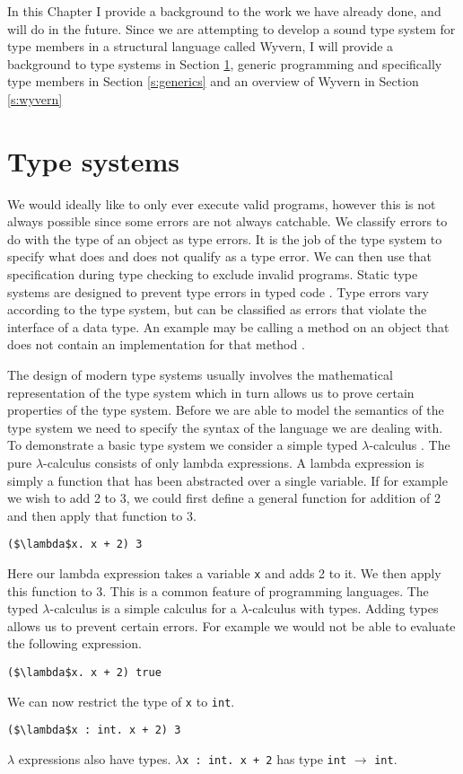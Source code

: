 \documentclass[11pt
              , a4paper
              , twoside
              , openright
              ]{report}
\numberwithin{case}{theorem}
\numberwithin{subcase}{case}
\begin{document}
In this Chapter I provide a background to the work we have already done, and will do in the future. Since we are attempting to develop a sound type system for type members in a structural language called Wyvern, I will provide a background to type systems in Section \ref{s:typesys}, generic programming and specifically type members in Section \ref{s:generics} and an overview of Wyvern in Section \ref{s:wyvern}

\section{Type systems}\label{s:typesys}
We would ideally like to only ever execute valid programs, however this is not always possible since some errors are not always catchable. We classify errors to do with the type of an object as type errors. It is the job of the type system to specify what does and does not qualify as a type error. We can then use that specification during type checking to exclude invalid programs. Static type systems are designed to prevent type errors in typed code \cite{Wright:1994:SAT:191905.191909}. Type errors vary according to the type system, but can be classified as errors that violate the interface of a data type. An example may be calling a method on an object that does not contain an implementation for that method \cite{Wright:1994:SAT:191905.191909}.

The design of modern type systems usually involves the mathematical representation of the type system which in turn allows us to prove certain properties of the type system. Before we are able to model the semantics of the type system we need to specify the syntax of the language we are dealing with. To demonstrate a basic type system we consider a simple typed $\lambda$-calculus \cite{church1940formulation, curry1959combinatory, Pierce:2002:TPL:509043, Barendregt:1993:LCT:162552.162561}. The pure $\lambda$-calculus consists of only lambda expressions. A lambda expression is simply a function that has been abstracted over a single variable. If for example we wish to add 2 to 3, we could first define a general function for addition of 2 and then apply that function to 3.
\begin{lstlisting}[mathescape, style=custom_lang]
($\lambda$x. x + 2) 3
\end{lstlisting}
Here our lambda expression takes a variable \verb|x| and adds 2 to it. We then apply this function to 3. This is a common feature of programming languages. The typed $\lambda$-calculus is a simple calculus for a $\lambda$-calculus with types. Adding types allows us to prevent certain errors. For example we would not be able to evaluate the following expression.
\begin{lstlisting}[mathescape, style=custom_lang]
($\lambda$x. x + 2) true
\end{lstlisting}
We can now restrict the type of \verb|x| to \verb|int|.
\begin{lstlisting}[mathescape, style=custom_lang]
($\lambda$x : int. x + 2) 3
\end{lstlisting}
$\lambda$ expressions also have types. $\lambda$\verb|x : int. x + 2| has type \verb|int| $\rightarrow$ \verb|int|. 
\end{document}
